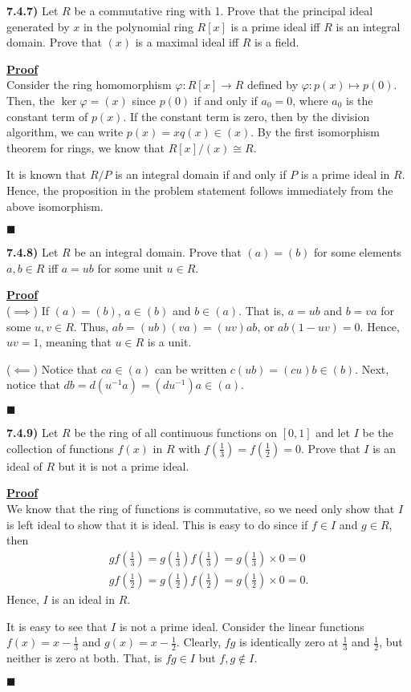 \documentclass[12pt,a4paper]{article}
\newcommand{\prob}[2]{\textbf{#1)} #2}
\newenvironment{proof}
{
\textbf{\underline{Proof}} \\
}
{
\begin{flushright}
$\blacksquare$
\end{flushright}}
\begin{document}
\prob{7.4.7}{
    Let $R$ be a commutative ring with 1.
Prove that the principal ideal generated by $x$ in the polynomial ring $R[x]$ is a prime ideal iff $R$ is an integral domain.
Prove that $(x)$ is a maximal ideal iff $R$ is a field.
}

\begin{proof}
    Consider the ring homomorphism $\varphi: R[x] \to R$ defined by $\varphi: p(x) \mapsto p(0)$.
    Then, the $\ker \varphi = (x)$ since $p(0)$ if and only if $a_0 = 0$, where $a_0$ is the constant term of $p(x)$.
    If the constant term is zero, then by the division algorithm, we can write $p(x) = xq(x) \in (x)$.
    By the first isomorphism theorem for rings, we know that $R[x]/(x) \cong R$.
    
    It is known that $R/P$ is an integral domain if and only if $P$ is a prime ideal in $R$.
    Hence, the proposition in the problem statement follows immediately from the above isomorphism.
\end{proof}

\prob{7.4.8}{
Let $R$ be an integral domain.
Prove that $(a) = (b)$ for some elements $a,b \in R$ iff $a = ub$ for some unit $u \in R$.
}

\begin{proof}
    ($\implies$) If $(a) = (b)$, $a \in (b)$ and $b \in (a)$. That is, $a = ub$ and $b = va$ for some $u,v \in R$.
    Thus, $ab = (ub)(va) = (uv)ab$, or $ab(1 - uv) = 0$.
    Hence, $uv = 1$, meaning that $u \in R$ is a unit.

    ($\impliedby$) Notice that $ca \in (a)$ can be written $c(ub) = (cu)b \in (b)$.
    Next, notice that $db = d(u^{-1}a) = (du^{-1})a \in (a)$.
\end{proof}

\prob{7.4.9}{
    Let $R$  be the ring of all continuous functions on $[0,1]$ and let $I$ be the collection of functions $f(x)$ in $R$ with $f(\frac{1}{3}) = f(\frac{1}{2}) = 0$.
    Prove that $I$ is an ideal of $R$ but it is not a prime ideal.
}

\begin{proof}
    We know that the ring of functions is commutative, so we need only show that $I$ is left ideal to show that it is ideal.
    This is easy to do since if $f \in I$ and $g \in R$, then
    \begin{align*}
        gf\left( \frac{1}{3} \right) = g\left(\frac{1}{3}\right)f\left(\frac{1}{3}\right) = g\left(\frac{1}{3}\right) \times 0 = 0 \\
        gf\left(\frac{1}{2}\right) = g\left(\frac{1}{2}\right)f\left(\frac{1}{2}\right) = g\left(\frac{1}{2}\right) \times 0 = 0 
    .\end{align*}
    Hence, $I$ is an ideal in $R$.

    It is easy to see that $I$ is not a prime ideal.
    Consider the linear functions $f(x) = x - \frac{1}{3}$ and $g(x) = x - \frac{1}{2}$.
    Clearly, $fg$ is identically zero at $\frac{1}{3}$ and $\frac{1}{2}$, but neither is zero at both.
    That, is $fg \in I$ but $f,g \not\in I$.
\end{proof}
\end{document}

